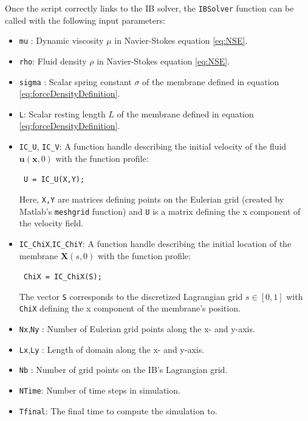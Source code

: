 \documentclass{article}
\newcommand{\mycode}[1]{\texttt{#1}}
\newcommand{\bs}[1]{\boldsymbol{#1}}
\begin{document}
Once the script correctly links to the IB solver, the \mycode{IBSolver} function can be called 
with the following input parameters:
\begin{itemize}
\item \mycode{mu} : Dynamic viscosity $\mu$ in Navier-Stokes equation \eqref{eq:NSE}.
\item \mycode{rho}: Fluid density $\rho$ in Navier-Stokes equation \eqref{eq:NSE}.
\item \mycode{sigma} : Scalar spring constant $\sigma$ of the membrane defined in equation \eqref{eq:forceDensityDefinition}.
\item \mycode{L}: Scalar resting length $L$ of the membrane defined in equation \eqref{eq:forceDensityDefinition}.

\item \mycode{IC\_U}, \mycode{IC\_V}: A function handle describing the initial velocity of the fluid $\bs{u}(\bs{x},0)$
						with the function profile:
						\begin{center}\mycode{ U = IC\_U(X,Y);}\end{center}
						Here, \mycode{X,Y} are matrices defining points on the Eulerian grid (created by Matlab's \mycode{meshgrid} function) and
						\mycode{U} is a matrix defining the x component of the velocity field.
\item \mycode{IC\_ChiX},\mycode{IC\_ChiY}: A function handle describing the initial location of the membrane $\bs{X}(s,0)$
							with the function profile:
							\begin{center}\mycode{ ChiX = IC\_ChiX(S);}\end{center}
							The vector \mycode{S} corresponds to the discretized Lagrangian grid $s\in[0,1]$ with
							\mycode{ChiX} defining the x component of the membrane's position.
							
\item \mycode{Nx},\mycode{Ny} : Number of Eulerian grid points along the x- and y-axis.
\item \mycode{Lx},\mycode{Ly} : Length of domain along the x- and y-axis.
\item \mycode{Nb} : Number of grid points on the IB's Lagrangian grid.
\item \mycode{NTime}: Number of time steps in simulation.
\item \mycode{Tfinal}: The final time to compute the simulation to.


\end{itemize}
\end{document}
